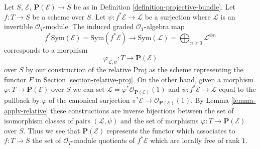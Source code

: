 \documentclass{stacks-project}
\theoremstyle{plain}
\theoremstyle{definition}
\theoremstyle{remark}
\numberwithin{equation}{subsection}
\begin{document}
\medskip\noindent
Let $S$, $\mathcal{E}$, $\mathbf{P}(\mathcal{E}) \to S$ be as in
Definition \ref{definition-projective-bundle}. Let $f : T \to S$
be a scheme over $S$. Let $\psi : f^*\mathcal{E} \to \mathcal{L}$
be a surjection where $\mathcal{L}$ is an invertible $\mathcal{O}_T$-module.
The induced graded $\mathcal{O}_T$-algebra map
$$
f^*\text{Sym}(\mathcal{E}) = \text{Sym}(f^*\mathcal{E}) \to
\text{Sym}(\mathcal{L}) = \bigoplus\nolimits_{n \geq 0} \mathcal{L}^{\otimes n}
$$
corresponds to a morphism
$$
\varphi_{\mathcal{L}, \psi} : T \longrightarrow \mathbf{P}(\mathcal{E})
$$
over $S$ by our construction of the relative Proj as the scheme representing
the functor $F$ in Section \ref{section-relative-proj}. On the other hand,
given a morphism $\varphi : T \to \mathbf{P}(\mathcal{E})$ over $S$
we can set $\mathcal{L} = \varphi^*\mathcal{O}_{\mathbf{P}(\mathcal{E})}(1)$
and $\psi : f^*\mathcal{E} \to \mathcal{L}$ equal to the pullback
by $\varphi$ of the canonical surjection
$\pi^*\mathcal{E} \to \mathcal{O}_{\mathbf{P}(\mathcal{E})}(1)$.
By Lemma \ref{lemma-apply-relative} these constructions
are inverse bijections between the set of isomorphism classes of pairs
$(\mathcal{L}, \psi)$ and the set of morphisms
$\varphi : T \to \mathbf{P}(\mathcal{E})$ over $S$.
Thus we see that $\mathbf{P}(\mathcal{E})$ represents the functor
which associates to $f : T \to S$ the set of $\mathcal{O}_T$-module
quotients of $f^*\mathcal{E}$ which are locally free of rank $1$.
\end{document}
